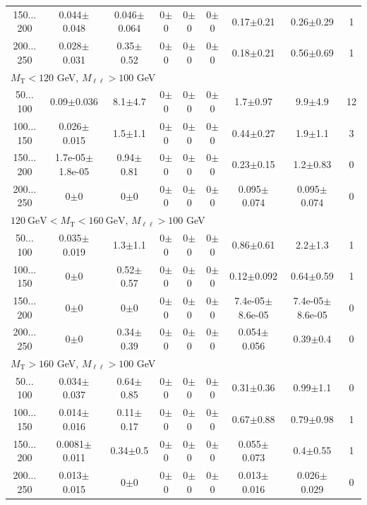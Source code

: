 \begin{landscape}
\begin{table}
\begin{center}
\begin{tabular}{| c | c c c c c c  | c  c | }
150$\dots$200&0.044$\pm$0.048&0.046$\pm$0.064&0$\pm$0&0$\pm$0&0$\pm$0&0.17$\pm$0.21&0.26$\pm$0.29&1\\
200$\dots$250&0.028$\pm$0.031&0.35$\pm$0.52&0$\pm$0&0$\pm$0&0$\pm$0&0.18$\pm$0.21&0.56$\pm$0.69&1\\
\hline\hline
\multicolumn{8}{l}{$M_{\text{T}} < 120$ GeV, $M_{\ell\ell} > 100$ GeV}\\\hline\hline
50$\dots$100&0.09$\pm$0.036&8.1$\pm$4.7&0$\pm$0&0$\pm$0&0$\pm$0&1.7$\pm$0.97&9.9$\pm$4.9&12\\
100$\dots$150&0.026$\pm$0.015&1.5$\pm$1.1&0$\pm$0&0$\pm$0&0$\pm$0&0.44$\pm$0.27&1.9$\pm$1.1&3\\
150$\dots$200&1.7e-05$\pm$1.8e-05&0.94$\pm$0.81&0$\pm$0&0$\pm$0&0$\pm$0&0.23$\pm$0.15&1.2$\pm$0.83&0\\
200$\dots$250&0$\pm$0&0$\pm$0&0$\pm$0&0$\pm$0&0$\pm$0&0.095$\pm$0.074&0.095$\pm$0.074&0\\
\hline\hline
\multicolumn{8}{l}{$120~\mathrm{GeV} < M_{\text{T}} < 160~\mathrm{GeV}$, $M_{\ell\ell} > 100$ GeV}\\\hline\hline
50$\dots$100&0.035$\pm$0.019&1.3$\pm$1.1&0$\pm$0&0$\pm$0&0$\pm$0&0.86$\pm$0.61&2.2$\pm$1.3&1\\
100$\dots$150&0$\pm$0&0.52$\pm$0.57&0$\pm$0&0$\pm$0&0$\pm$0&0.12$\pm$0.092&0.64$\pm$0.59&1\\
150$\dots$200&0$\pm$0&0$\pm$0&0$\pm$0&0$\pm$0&0$\pm$0&7.4e-05$\pm$8.6e-05&7.4e-05$\pm$8.6e-05&0\\
200$\dots$250&0$\pm$0&0.34$\pm$0.39&0$\pm$0&0$\pm$0&0$\pm$0&0.054$\pm$0.056&0.39$\pm$0.4&0\\
\hline\hline
\multicolumn{8}{l}{$M_{\text{T}} > 160$ GeV, $M_{\ell\ell} > 100$ GeV}\\\hline\hline
50$\dots$100&0.034$\pm$0.037&0.64$\pm$0.85&0$\pm$0&0$\pm$0&0$\pm$0&0.31$\pm$0.36&0.99$\pm$1.1&0\\
100$\dots$150&0.014$\pm$0.016&0.11$\pm$0.17&0$\pm$0&0$\pm$0&0$\pm$0&0.67$\pm$0.88&0.79$\pm$0.98&1\\
150$\dots$200&0.0081$\pm$0.011&0.34$\pm$0.5&0$\pm$0&0$\pm$0&0$\pm$0&0.055$\pm$0.073&0.4$\pm$0.55&1\\
200$\dots$250&0.013$\pm$0.015&0$\pm$0&0$\pm$0&0$\pm$0&0$\pm$0&0.013$\pm$0.016&0.026$\pm$0.029&0\\
\hline\hline
\end{tabular}
\end{center}
\end{table}

\end{landscape}
